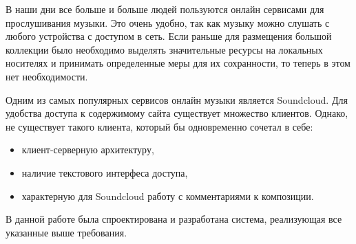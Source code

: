 В наши дни все больше и больше людей пользуются онлайн сервисами для
прослушивания музыки. Это очень удобно, так как музыку можно слушать с
любого устройства  с доступом в сеть. Если раньше для размещения
большой коллекции было необходимо выделять значительные ресурсы на
локальных носителях и принимать определенные меры для их сохранности,
то теперь в этом нет необходимости. 

Одним из самых популярных сервисов онлайн музыки является
Soundcloud\cite{soundcloud:main}. Для удобства доступа к содержимому
сайта существует множество  клиентов. Однако, не существует такого
клиента, который бы одновременно сочетал в себе:

\begin{itemize}
\item {клиент-серверную архитектуру, }
\item {наличие текстового интерфеса доступа, }  
\item {характерную для Soundcloud работу с комментариями к композиции.}
\end{itemize}

В данной работе была спроектирована и разработана система, реализующая
все указанные выше требования. 



